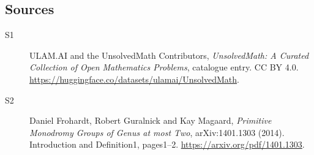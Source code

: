 \documentclass[11pt]{book}
\begin{document}
\subsection{Sources}
\begin{description}
\item[\hypertarget{source:statement:1}{S1}] ULAM.AI and the UnsolvedMath Contributors, \emph{UnsolvedMath: A Curated Collection of Open Mathematics Problems}, catalogue entry. CC BY 4.0. \url{https://huggingface.co/datasets/ulamai/UnsolvedMath}.
\item[\hypertarget{source:statement:2}{S2}] Daniel Frohardt, Robert Guralnick and Kay Magaard, \emph{Primitive Monodromy Groups of Genus at most Two}, arXiv:1401.1303 (2014). Introduction and Definition1, pages1--2. \url{https://arxiv.org/pdf/1401.1303}.
\end{description}
\label{end:statement}
\end{document}
